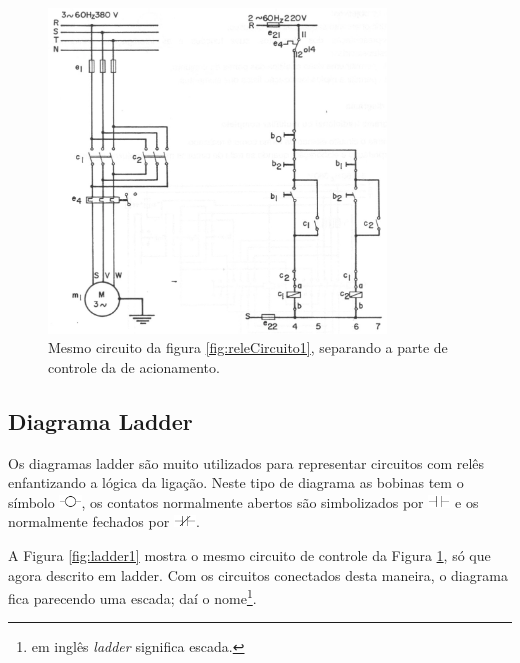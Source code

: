 \begin{figure}[hbt]
  \begin{center}
    \includegraphics[width=0.8\textwidth]{figuras/releCircuito2} %
  \end{center}
  \caption{Mesmo circuito da figura \ref{fig:releCircuito1}, separando a parte de controle da de acionamento.}
  \label{fig:releCircuito2}
\end{figure}

\subsection{Diagrama Ladder}
\label{sec:diagrama-ladder}

Os diagramas ladder são muito utilizados para representar circuitos com relês enfantizando a lógica da ligação. Neste tipo de diagrama as bobinas tem o símbolo \includegraphics[height=0.9em]{figuras/bobina_ladder}, os contatos normalmente abertos são simbolizados por \includegraphics[height=0.9em]{figuras/na_ladder} e os normalmente fechados por \includegraphics[height=0.9em]{figuras/nf_ladder}.

A Figura \ref{fig:ladder1} mostra o mesmo circuito de controle da Figura \ref{fig:releCircuito2}, só que agora descrito em ladder. Com os circuitos conectados desta maneira, o diagrama fica parecendo uma escada; daí o nome\footnote{em inglês \emph{ladder} significa escada.}.



